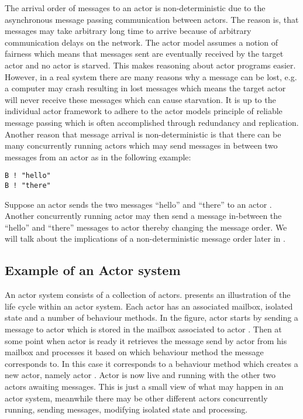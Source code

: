 The arrival order of messages to an actor is non-deterministic due to the asynchronous message passing communication between actors\cite[p. 2]{karmani2011actors}. The reason is, that messages may take arbitrary long time to arrive because of arbitrary communication delays on the network. The actor model assumes a notion of fairness which means that messages sent are eventually received by the target actor and no actor is starved\cite[Chap. 2.5]{haller2012actors}\cite[p. 3]{karmani2009actor}. This makes reasoning about actor programs easier\cite{tasharofi2013scala}. However, in a real system there are many reasons why a message can be lost, e.g. a computer may crash resulting in lost messages which means the target actor will never receive these messages which can cause starvation. It is up to the individual actor framework to adhere to the actor models principle of reliable message passing which is often accomplished through redundancy and replication\cite[Chap. 2.5]{haller2012actors}. Another reason that message arrival is non-deterministic is that there can be many concurrently running actors which may send messages in between two messages from an actor as in the following example:
\begin{verbatim}
B ! "hello"
B ! "there"
\end{verbatim}
Suppose an actor  sends the two messages ``hello'' and ``there'' to an actor . Another concurrently running actor  may then send a message in-between the ``hello'' and ``there'' messages to actor  thereby changing the message order. We will talk about the implications of a non-deterministic message order later in .

\subsection{Example of an Actor system}
An actor system consists of a collection of actors.  presents an illustration of the life cycle within an actor system. Each actor has an associated mailbox, isolated state and a number of behaviour methods. In the figure, actor  starts by sending a message to actor  which is stored in the mailbox associated to actor . Then at some point when actor  is ready it retrieves the message send by actor  from his mailbox and processes it based on which behaviour method the message corresponds to. In this case it corresponds to a behaviour method which creates a new actor, namely actor . Actor  is now live and running with the other two actors awaiting messages. This is just a small view of what may happen in an actor system, meanwhile there may be other different actors concurrently running, sending messages, modifying isolated state and processing.

